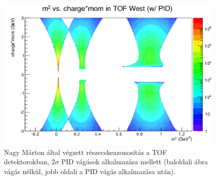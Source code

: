 \documentclass[11pt,a4paper]{article}
\numberwithin{equation}{subsection}
\numberwithin{figure}{section}
\begin{document}
\begin{figure}[H]
\includegraphics[scale=0.39]{pic/dat/nm/h_m2sum_tofw_pid.png}
\caption{Nagy Márton által végzett részecskeazonosítás a TOF detektorokban, $2\sigma$ PID vágások alkalmazása mellett (baloldali ábra vágás nélkül, jobb oldali a PID vágás alkalmazása után).}
\label{fig:m2sum1}
\end{figure}
\end{document}
